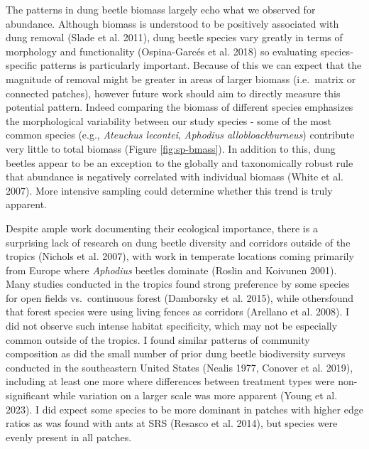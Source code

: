 \documentclass[
  man, donotrepeattitle]{apa6}
\begin{document}
The patterns in dung beetle biomass largely echo what we observed for abundance. Although biomass is understood to be positively associated with dung removal (Slade et al. 2011), dung beetle species vary greatly in terms of morphology and functionality (Ospina-Garcés et al. 2018) so evaluating species-specific patterns is particularly important. Because of this we can expect that the magnitude of removal might be greater in areas of larger biomass (i.e.~matrix or connected patches), however future work should aim to directly measure this potential pattern. Indeed comparing the biomass of different species emphasizes the morphological variability between our study species - some of the most common species (e.g., \emph{Ateuchus lecontei}, \emph{Aphodius allobloackburneus}) contribute very little to total biomass (Figure \ref{fig:sp-bmass}). In addition to this, dung beetles appear to be an exception to the globally and taxonomically robust rule that abundance is negatively correlated with individual biomass (White et al. 2007). More intensive sampling could determine whether this trend is truly apparent.

Despite ample work documenting their ecological importance, there is a surprising lack of research on dung beetle diversity and corridors outside of the tropics (Nichols et al. 2007), with work in temperate locations coming primarily from Europe where \emph{Aphodius} beetles dominate (Roslin and Koivunen 2001). Many studies conducted in the tropics found strong preference by some species for open fields vs.~continuous forest (Damborsky et al. 2015), while othersfound that forest species were using living fences as corridors (Arellano et al. 2008). I did not observe such intense habitat specificity, which may not be especially common outside of the tropics. I found similar patterns of community composition as did the small number of prior dung beetle biodiversity surveys conducted in the southeastern United States (Nealis 1977, Conover et al. 2019), including at least one more where differences between treatment types were non-significant while variation on a larger scale was more apparent (Young et al. 2023). I did expect some species to be more dominant in patches with higher edge ratios as was found with ants at SRS (Resasco et al. 2014), but species were evenly present in all patches.
\end{document}
